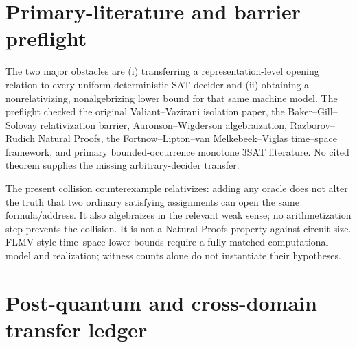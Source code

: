 \documentclass[11pt]{article}
\begin{document}
\section*{Primary-literature and barrier preflight}

The two major obstacles are (i) transferring a representation-level opening
relation to every uniform deterministic SAT decider and (ii) obtaining a
nonrelativizing, nonalgebrizing lower bound for that same machine model.
The preflight checked the original Valiant--Vazirani isolation paper, the
Baker--Gill--Solovay relativization barrier, Aaronson--Wigderson algebraization,
Razborov--Rudich Natural Proofs, the Fortnow--Lipton--van Melkebeek--Viglas
time--space framework, and primary bounded-occurrence monotone 3SAT literature.
No cited theorem supplies the missing arbitrary-decider transfer.

The present collision counterexample relativizes: adding any oracle does not
alter the truth that two ordinary satisfying assignments can open the same
formula/address.  It also algebraizes in the relevant weak sense; no
arithmetization step prevents the collision.  It is not a Natural-Proofs
property against circuit size.  FLMV-style time--space lower bounds require a
fully matched computational model and realization; witness counts alone do
not instantiate their hypotheses.

\section*{Post-quantum and cross-domain transfer ledger}
\end{document}
